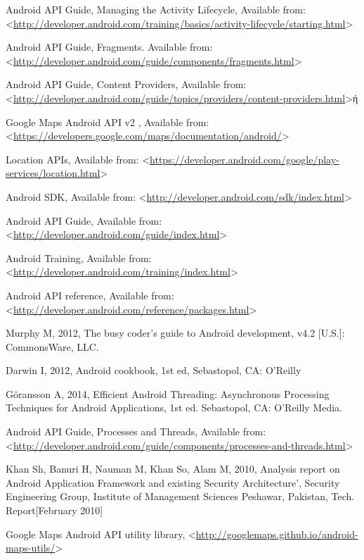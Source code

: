 \begin{thebibliography}{99}
 Android API Guide, Managing the Activity Lifecycle, Available from: <\url{http://developer.android.com/training/basics/activity-lifecycle/starting.html}>

 Android API Guide, Fragments. Available from: <\url{http://developer.android.com/guide/components/fragments.html}>

 Android API Guide, Content Providers, Available from: <\url{http://developer.android.com/guide/topics/providers/content-providers.html}>ή

 Google Maps Android API v2 , Available from: <\url{https://developers.google.com/maps/documentation/android/}>

 Location APIs, Available from: <\url{https://developer.android.com/google/play-services/location.html}>

Android SDK, Available from: <\url{http://developer.android.com/sdk/index.html}>

 Android API Guide, Available from: <\url{http://developer.android.com/guide/index.html}>

Android Training, Available from: <\url{http://developer.android.com/training/index.html}>

 Android API reference, Available from: <\url{http://developer.android.com/reference/packages.html}>

 Murphy M, 2012, The busy coder's guide to Android development, v4.2 [U.S.]: CommonsWare, LLC.

 Darwin I, 2012, Android cookbook, 1st ed, Sebastopol, CA: O'Reilly

 Göransson A, 2014, Efficient Android Threading:  Asynchronous Processing Techniques for Android Applications, 1st ed. Sebastopol, CA: O'Reilly Media.

 Android API Guide, Processes and Threads, Available from: <\url{http://developer.android.com/guide/components/processes-and-threads.html}>

 Khan Sh, Banuri H, Nauman M, Khan So, Alam M, 2010, Analysis report on Android Application Framework and existing Security Architecture', Security Engineering Group, Institute of Management Sciences Peshawar, Pakistan, Tech. Report[February 2010]

 Google Maps Android API utility library, <\url{http://googlemaps.github.io/android-maps-utils/}>


\end{thebibliography}
